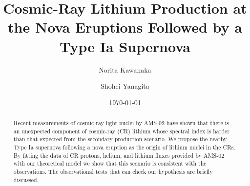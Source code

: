 \documentclass[twocolumn,showpacs,amsmath,amssymb]{revtex4-1}
\begin{document}

\title{Cosmic-Ray Lithium Production at the Nova Eruptions Followed by a Type Ia Supernova}


\author{Norita Kawanaka}
\author{Shohei Yanagita}

\begin{abstract}
Recent measurements of cosmic-ray light nuclei by AMS-02 have shown that there is an unexpected component of cosmic-ray (CR) lithium whose spectral index is harder than that expected from the secondary production scenario.  We propose the nearby Type Ia supernova following a nova eruption as the origin of lithium nuclei in the CRs.  By fitting the data of CR protons, helium, and lithium fluxes provided by AMS-02 with our theoretical model we show that this scenario is consistent with the observations.  The observational tests that can check our hypothesis are briefly discussed.
\end{abstract}

\date{\today}
\maketitle
\end{document}
